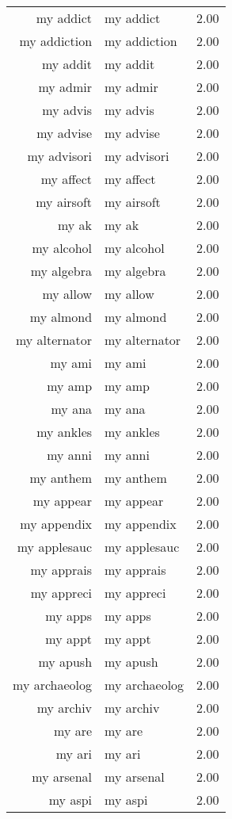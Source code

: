 \begin{table}[ht]
\begin{tabular}{rlr}
  my addict & my addict & 2.00 \\ 
  my addiction & my addiction & 2.00 \\ 
  my addit & my addit & 2.00 \\ 
  my admir & my admir & 2.00 \\ 
  my advis & my advis & 2.00 \\ 
  my advise & my advise & 2.00 \\ 
  my advisori & my advisori & 2.00 \\ 
  my affect & my affect & 2.00 \\ 
  my airsoft & my airsoft & 2.00 \\ 
  my ak & my ak & 2.00 \\ 
  my alcohol & my alcohol & 2.00 \\ 
  my algebra & my algebra & 2.00 \\ 
  my allow & my allow & 2.00 \\ 
  my almond & my almond & 2.00 \\ 
  my alternator & my alternator & 2.00 \\ 
  my ami & my ami & 2.00 \\ 
  my amp & my amp & 2.00 \\ 
  my ana & my ana & 2.00 \\ 
  my ankles & my ankles & 2.00 \\ 
  my anni & my anni & 2.00 \\ 
  my anthem & my anthem & 2.00 \\ 
  my appear & my appear & 2.00 \\ 
  my appendix & my appendix & 2.00 \\ 
  my applesauc & my applesauc & 2.00 \\ 
  my apprais & my apprais & 2.00 \\ 
  my appreci & my appreci & 2.00 \\ 
  my apps & my apps & 2.00 \\ 
  my appt & my appt & 2.00 \\ 
  my apush & my apush & 2.00 \\ 
  my archaeolog & my archaeolog & 2.00 \\ 
  my archiv & my archiv & 2.00 \\ 
  my are & my are & 2.00 \\ 
  my ari & my ari & 2.00 \\ 
  my arsenal & my arsenal & 2.00 \\ 
  my aspi & my aspi & 2.00 \\ 

\end{tabular}
\end{table}
